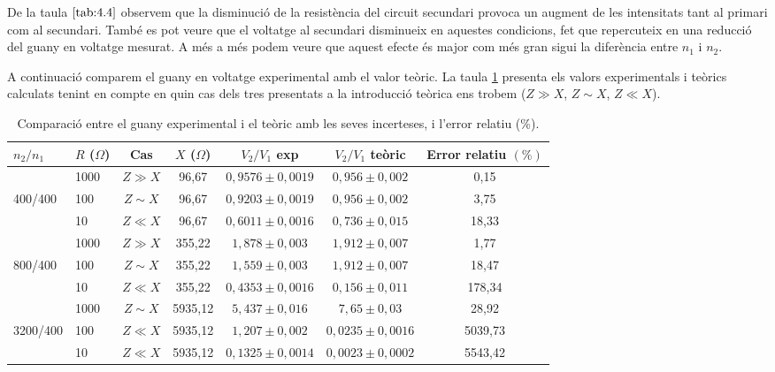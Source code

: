 \documentclass[a4paper,10.5pt]{report}
\begin{document}
De la taula $\ref{tab:4.4}$ observem que la disminució de la resistència del circuit secundari provoca un augment de les intensitats tant al primari com al secundari. També es pot veure que el voltatge al secundari disminueix en aquestes condicions, fet que repercuteix en una reducció del guany en voltatge mesurat. A més a més podem veure que aquest efecte és major com més gran sigui la diferència entre $n_1$ i $n_2$.

A continuació comparem el guany en voltatge experimental amb el valor teòric. La  taula \ref{tab:4.5} presenta els valors experimentals i teòrics calculats tenint en compte en quin cas dels tres presentats a la introducció teòrica ens trobem ($Z \gg X$, $Z \sim X$, $Z\ll X$).  

\begin{table}[H]
	\centering
	\renewcommand{\arraystretch}{1.2}
	\caption{Comparació entre el guany experimental i el teòric amb les seves incerteses, i l’error relatiu (\%).}
	\begin{tabular}{llccccc}
		\toprule
		$n_2/n_1$ & $R$ ($\Omega$) &Cas & $X$ ($\Omega$) & $V_2/V_1$ exp & $V_2/V_1$ teòric & Error relatiu $(\%)$ \\
		\midrule
		& 1000 &  $Z \gg X$ & 96,67& $0{,}9576 \pm 0{,}0019$ & $0{,}956 \pm 0{,}002$ & 0,15 \\
		400/400& 100 & $Z \sim X$ & 96,67 & $0{,}9203 \pm 0{,}0019$ & $0{,}956 \pm 0{,}002$ & 3,75 \\
		& 10 & $Z \ll X$ & 96,67 & $0{,}6011 \pm 0{,}0016$ & $0{,}736 \pm 0{,}015$ & 18,33 \\
		\midrule
		& 1000 &  $Z \gg X$ &  355,22& $1{,}878 \pm 0{,}003$ & $1{,}912 \pm 0{,}007$ & 1,77 \\
		800/400 & 100 &  $Z \sim X$ & 355,22 & $1{,}559 \pm 0{,}003$ & $1{,}912 \pm 0{,}007$ & 18,47 \\
		& 10 & $Z \ll X$ & 355,22 & $0{,}4353 \pm 0{,}0016$ & $0{,}156 \pm 0{,}011$ & 178,34 \\
		\midrule
		& 1000 & $Z \sim X$ & 5935,12 & $5{,}437 \pm 0{,}016$ & $7{,}65 \pm 0{,}03$ & 28,92 \\
		3200/400 & 100 & $Z \ll X$ & 5935,12 & $1{,}207 \pm 0{,}002$ & $0{,}0235 \pm 0{,}0016$ & 5039,73 \\
		& 10 & $Z \ll X$ &5935,12 & $0{,}1325 \pm 0{,}0014$ & $0{,}0023 \pm 0{,}0002$ & 5543,42 \\
		\bottomrule
	\end{tabular}
	\label{tab:4.5}
\end{table}
\end{document}
